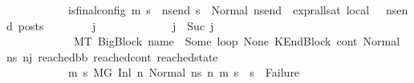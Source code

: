 \begin{isabellebody}
\ \ \ \ \ \ \ \ \ \ \ is{\isacharunderscore}{\kern0pt}final{\isacharunderscore}{\kern0pt}config\ {\isacharparenleft}{\kern0pt}m{\isacharprime}{\kern0pt}{\isacharcomma}{\kern0pt}\ s{\isacharprime}{\kern0pt}{\isacharparenright}{\kern0pt}\ {\isasymLongrightarrow}\ {\isasymforall}ns{\isacharunderscore}{\kern0pt}end{\isachardot}{\kern0pt}\ s{\isacharprime}{\kern0pt}\ {\isacharequal}{\kern0pt}\ Normal\ ns{\isacharunderscore}{\kern0pt}end\ {\isasymlongrightarrow}\ {\isacharparenleft}{\kern0pt}expr{\isacharunderscore}{\kern0pt}all{\isacharunderscore}{\kern0pt}sat\ {\isasymLambda}{}{\isacharunderscore}{\kern0pt}local\ {\isasymGamma}\ {\isasymOmega}\ ns{\isacharunderscore}{\kern0pt}end{\isacharparenright}{\kern0pt}\ posts{\isachardoublequoteclose}\isanewline
\ \ \ \ \ \ \ {\isachardoublequoteopen}{\isasymAnd}\ j{\isacharprime}{\kern0pt}{\isacharprime}{\kern0pt}{\isachardot}{\kern0pt}\ \isanewline
\ \ \ \ \ \ \ \ \ \ \ \ j\ {\isacharequal}{\kern0pt}\ Suc\ j{\isacharprime}{\kern0pt}{\isacharprime}{\kern0pt}\ {\isasymLongrightarrow}\isanewline
\ \ \ \ \ \ \ \ \ \ \ \ M{\isacharcomma}{\kern0pt}{\isasymLambda}{\isacharcomma}{\kern0pt}{\isasymGamma}{\isacharcomma}{\kern0pt}{\isasymOmega}{\isacharcomma}{\kern0pt}T\ {\isasymturnstile}{\isacharparenleft}{\kern0pt}BigBlock\ name\ {\isacharbrackleft}{\kern0pt}{\isacharbrackright}{\kern0pt}\ {\isacharparenleft}{\kern0pt}Some\ loop{\isacharparenright}{\kern0pt}\ None{\isacharcomma}{\kern0pt}\ KEndBlock\ cont{}{\isacharcomma}{\kern0pt}\ Normal\ ns{}{\isacharprime}{\kern0pt}{\isacharprime}{\kern0pt}{\isacharparenright}{\kern0pt}\ {\isacharminus}{\kern0pt}n{\isasymlongrightarrow}{\isacharcircum}{\kern0pt}j{\isacharprime}{\kern0pt}{\isacharprime}{\kern0pt}\ {\isacharparenleft}{\kern0pt}reached{\isacharunderscore}{\kern0pt}bb{\isacharcomma}{\kern0pt}\ reached{\isacharunderscore}{\kern0pt}cont{\isacharcomma}{\kern0pt}\ reached{\isacharunderscore}{\kern0pt}state{\isacharparenright}{\kern0pt}\ {\isasymLongrightarrow}\isanewline
\ \ \ \ \ \ \ \ \ \ \ {\isacharparenleft}{\kern0pt}{\isasymAnd}m{\isacharprime}{\kern0pt}\ s{\isacharprime}{\kern0pt}{\isachardot}{\kern0pt}\ M{\isacharcomma}{\kern0pt}{\isasymLambda}{\isacharcomma}{\kern0pt}{\isasymGamma}{\isacharcomma}{\kern0pt}{\isasymOmega}{\isacharcomma}{\kern0pt}G\ {\isasymturnstile}{\isacharparenleft}{\kern0pt}Inl\ n{\isacharcomma}{\kern0pt}\ Normal\ ns{}{\isacharprime}{\kern0pt}{\isacharprime}{\kern0pt}{\isacharparenright}{\kern0pt}\ {\isacharminus}{\kern0pt}n{\isasymrightarrow}{\isacharasterisk}{\kern0pt}\ {\isacharparenleft}{\kern0pt}m{\isacharprime}{\kern0pt}{\isacharcomma}{\kern0pt}\ s{\isacharprime}{\kern0pt}{\isacharparenright}{\kern0pt}\ {\isasymLongrightarrow}\ s{\isacharprime}{\kern0pt}\ {\isasymnoteq}\ Failure{\isacharparenright}{\kern0pt}\ {\isasymLongrightarrow}\isanewline

\end{isabellebody}
